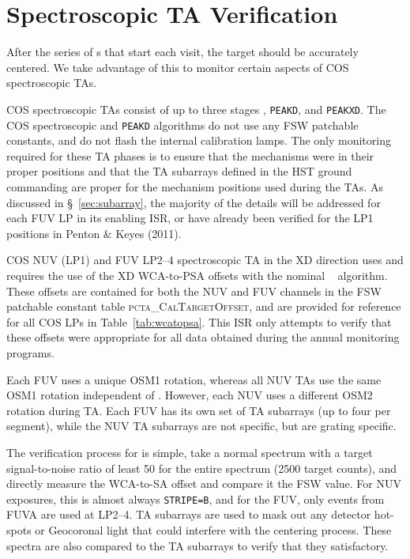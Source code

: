 \section{Spectroscopic TA Verification}\label{sec:spVER}
\normalsize
After the series of s that start each visit, the target should be accurately centered.
We take advantage of this to monitor certain aspects of COS spectroscopic TAs.

COS spectroscopic TAs consist of up to three stages , \texttt{PEAKD}, and \texttt{PEAKXD}.
The COS spectroscopic  and \texttt{PEAKD} algorithms do not use any FSW patchable constants, and do not flash the
internal calibration lamps. The only monitoring required for these TA phases is to ensure that the mechanisms were in their proper
positions and that the TA subarrays defined in the HST ground commanding are proper for the mechanism positions used during the TAs.
As discussed in \S~\ref{sec:subarray}, the majority of the details will be addressed for each FUV LP in its enabling ISR, or have already been verified
for the LP1 positions in Penton \& Keyes (2011).

COS NUV (LP1) and FUV LP2--4 spectroscopic TA in the XD direction uses  and requires the use of the XD WCA-to-PSA offsets with the nominal \numposone~ algorithm.
These offsets are contained for both the NUV and FUV channels in the FSW patchable constant table \textsc{pcta\_CalTargetOffset}, and are provided for reference for all COS LPs in Table~\ref{tab:wcatopsa}.
This ISR only attempts to verify that these offsets were appropriate for all data obtained during the annual monitoring programs.

Each FUV \cenwave{} uses a unique OSM1 rotation, whereas all NUV TAs use the same OSM1 rotation independent of \cenwave{}.
However, each NUV \cenwave{} uses a different OSM2 rotation during TA. Each FUV \cenwave{} has its own set of TA subarrays (up to four per segment), while the NUV TA subarrays are not \cenwave{}
specific, but are grating specific.

The verification process for  is simple, take a normal spectrum with a target signal-to-noise ratio of least 50 for the entire spectrum (2500 target counts),
and directly measure the WCA-to-SA offset and compare it the FSW value. For NUV exposures, this is almost always \texttt{STRIPE=B}, and for the FUV, only events from FUVA are used at LP2--4.
TA subarrays are used to mask out any detector hot-spots or Geocoronal light that could interfere with the centering process. These spectra are also compared to the TA subarrays to
verify that they satisfactory.

